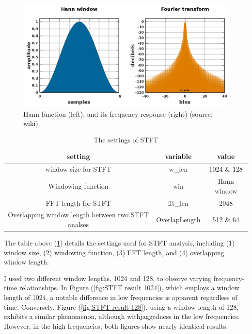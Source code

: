 \documentclass[journal,12pt,onecolumn,draftclsnofoot]{IEEEtran}
\begin{document}
        \begin{figure}[H]
            \centering
                \includegraphics[width=0.7\linewidth]{figures/hann window.png}
            \caption{Hann function (left), and its frequency response (right) (source: wiki)}
            \label{fig:hann window}
        \end{figure}

        \begin{table}[H]
        \centering
        \begin{tabular}{|c|c|c|}
            \hline 
            setting & variable & value \\ \hline \hline
            window size for STFT & w\_len & 1024 \& 128 \\ \hline
            Windowing function & win & Hann window \\ \hline
            FFT length for STFT & fft\_len & 2048 \\ \hline
            Overlapping window length between two STFT analses & OverlapLength & 512 \& 64 \\ \hline
        \end{tabular} 
        \caption[short]{The settings of STFT} 
        \label{table}
        \end{table}

        The table above (\ref{table}) details the settings used for STFT analysis, including (1) window size, (2) windowing function, (3) FFT length, and (4) overlapping window length.

        I used two different window lengths, 1024 and 128, to observe varying frequency-time relationships. In Figure (\ref{fig:STFT result 1024}), 
        which employs a window length of 1024, a notable difference in low frequencies is apparent regardless of time. 
        Conversely, Figure (\ref{fig:STFT result 128}), using a window length of 128, exhibits a similar phenomenon, although withjaggedness in the low frequencies. 
        However, in the high frequencies, both figures show nearly identical results.
\end{document}
